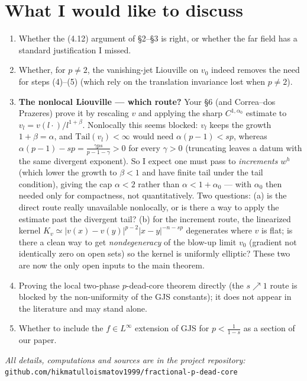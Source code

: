\documentclass[11pt]{amsart}
\newcommand{\al}{\alpha}
\begin{document}
\section{What I would like to discuss}
\begin{enumerate}
\item Whether the (4.12) argument of \S2--\S3 is right, or whether the
  far field has a standard justification I missed.
\item Whether, for $p\neq2$, the vanishing-jet Liouville on $v_0$ indeed
  removes the need for steps (4)--(5) (which rely on the translation
  invariance lost when $p\neq2$).
\item \textbf{The nonlocal Liouville --- which route?} Your \S6 (and
  Correa--dos Prazeres) prove it by rescaling $v$ and applying the sharp
  $C^{1,\al_0}$ estimate to $v_l=v(l\cdot)/l^{1+\beta}$. Nonlocally this
  seems blocked: $v_l$ keeps the growth $1+\beta=\al$, and
  $\mathrm{Tail}(v_l)<\infty$ would need $\al(p-1)<sp$, whereas
  $\al(p-1)-sp=\frac{\gamma ps}{p-1-\gamma}>0$ for every $\gamma>0$
  (truncating leaves a datum with the same divergent exponent). So I expect
  one must pass to \emph{increments} $w^h$ (which lower the growth to
  $\beta<1$ and have finite tail under the tail condition), giving the cap
  $\al<2$ rather than $\al<1+\al_0$ --- with $\al_0$ then needed only for
  compactness, not quantitatively. Two questions: (a) is the direct route
  really unavailable nonlocally, or is there a way to apply the estimate
  past the divergent tail? (b) for the increment route, the linearized
  kernel $K_v\simeq|v(x)-v(y)|^{p-2}|x-y|^{-n-sp}$ degenerates where $v$ is
  flat; is there a clean way to get \emph{nondegeneracy} of the blow-up
  limit $v_0$ (gradient not identically zero on open sets) so the kernel is
  uniformly elliptic? These two are now the only open inputs to the main
  theorem.
\item Proving the local two-phase $p$-dead-core theorem directly (the
  $s\nearrow1$ route is blocked by the non-uniformity of the GJS
  constants); it does not appear in the literature and may stand alone.
\item Whether to include the $f\in L^\infty$ extension of GJS for
  $p<\frac{1}{1-s}$ as a section of our paper.
\end{enumerate}

\medskip
\noindent\emph{All details, computations and sources are in the project
repository:} \texttt{github.com/hikmatulloismatov1999/fractional-p-dead-core}
\end{document}

